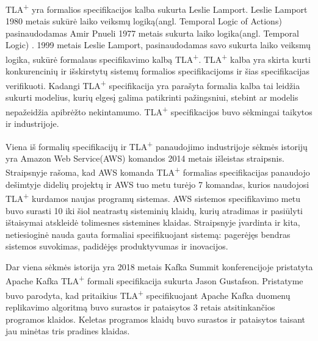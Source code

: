\documentclass{VUMIFPSmagistrinis}
\begin{document}
		TLA\textsuperscript{+} yra formalios specifikacijos kalba sukurta Leslie Lamport\cite{lamport2002specifying}.
		Leslie Lamport 1980 metais sukūrė laiko veiksmų logiką(angl. Temporal Logic of Actions)\cite{10.1145/177492.177726} pasinaudodamas Amir Pnueli 1977 metais sukurta laiko logika(angl. Temporal Logic) \cite{4567924}.
		1999 metais Leslie Lamport, pasinaudodamas savo sukurta laiko veiksmų logika, sukūrė formalaus specifikavimo kalbą TLA\textsuperscript{+}\cite{lamport2002specifying}.
		TLA\textsuperscript{+} kalba yra skirta kurti konkurencinių ir išskirstytų sistemų formalios specifikacijoms ir šias specifikacijas verifikuoti.
		Kadangi TLA\textsuperscript{+} specifikacija yra parašyta formalia kalba tai leidžia sukurti modelius, kurių elgesį galima patikrinti pažingsniui, stebint ar modelis nepažeidžia apibrėžto nekintamumo.
		TLA\textsuperscript{+} specifikacijos buvo sėkmingai taikytos ir industrijoje.


		Viena iš formalių specifikacijų ir TLA\textsuperscript{+} panaudojimo industrijoje sėkmės istorijų yra Amazon Web Service(AWS) komandos 2014 metais išleistas straipsnis\cite{newcombe2014use}.
		Straipsnyje rašoma,  kad AWS komanda TLA\textsuperscript{+} formalias specifikacijas panaudojo dešimtyje didelių projektų ir AWS tuo metu turėjo 7 komandas, kurios naudojosi TLA\textsuperscript{+} kurdamos naujas programų sistemas.
		AWS sistemos specifikavimo metu buvo surasti 10 iki šiol neatrastų sisteminių klaidų, kurių atradimas ir pasiūlyti ištaisymai atskleidė tolimesnes sistemines klaidas.
		Straipsnyje įvardinta ir kita, netiesioginė nauda gauta formaliai specifikuojant sistemą: pagerėjęs bendras sistemos suvokimas, padidėjęs produktyvumas ir inovacijos.
		

		Dar viena sėkmės istorija yra 2018 metais Kafka Summit konferencijoje pristatyta Apache Kafka TLA\textsuperscript{+} formali specifikacija sukurta Jason Gustafson\cite{kfkTla}.
		Pristatyme buvo parodyta, kad pritaikius TLA\textsuperscript{+} specifikuojant Apache Kafka duomenų replikavimo algoritmą buvo surastos ir pataisytos 3 retais atsitinkančios programos klaidos.
		Keletas programos klaidų buvo surastos ir pataisytos taisant jau minėtas tris pradines klaidas.
\end{document}
